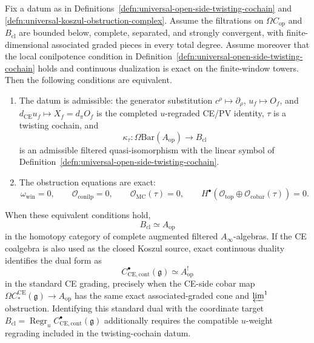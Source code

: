 \begin{thm}
\label{thm:universal-filtered-cobar-recognition}
  Fix a datum as in
  Definitions~\ref{defn:universal-open-side-twisting-cochain} and
  \ref{defn:universal-koszul-obstruction-complex}.  Assume the
  filtrations on \(\Omega C_{\mathrm{op}}\) and \(B_{\mathrm{cl}}\) are
  bounded below, complete, separated, and strongly convergent, with
  finite-dimensional associated graded pieces in every total degree.
  Assume moreover that the local conilpotence condition in
  Definition~\ref{defn:universal-open-side-twisting-cochain} holds and
  continuous dualization is exact on the finite-window towers.
  Then the following conditions are equivalent.
  \begin{enumerate}[label=(A\arabic*)]
    \item The datum is admissible: the generator substitution
      \(c^\rho\mapsto\partial_\rho\), \(u_f\mapsto O_f\), and
      \(d_{\mathrm{CE}}u_f\mapsto X_f=d_\pi O_f\) is the completed
      \(u\)-regraded CE/PV identity,
      \(\tau\) is a twisting cochain, and
      \[
        \kappa_\tau\colon
        \Omega\mathrm{Bar}(A_{\mathrm{op}})
        \longrightarrow B_{\mathrm{cl}}
      \]
      is an admissible filtered quasi-isomorphism with the linear symbol
      of Definition~\ref{defn:universal-open-side-twisting-cochain}.
    \item The obstruction equations are exact:
      \[
        \omega_{\mathrm{win}}=0,\qquad
        \mathcal O_{\mathrm{conilp}}=0,\qquad
        \mathcal O_{\mathrm{MC}}(\tau)=0,\qquad
        H^\bullet\!\left(
          \mathcal O_{\mathrm{top}}
          \oplus
          \mathcal O_{\mathrm{cobar}}(\tau)
        \right)=0 .
      \]
  \end{enumerate}
  When these equivalent conditions hold,
  \[
    B_{\mathrm{cl}}
      \simeq
    A_{\mathrm{op}}
  \]
  in the homotopy category of complete augmented filtered
  \(A_\infty\)-algebras.  If the CE coalgebra is also used as the closed
  Koszul source, exact continuous duality identifies the dual form as
  \[
    C^\bullet_{\mathrm{CE},\mathrm{cont}}(\mathfrak g)
      \simeq
    A_{\mathrm{op}}^!
  \]
  in the standard CE grading, precisely when the CE-side cobar map
  \(\Omega C_*^{\mathrm{CE}}(\mathfrak g)\to A_{\mathrm{op}}\) has the
  same exact associated-graded cone and \(\varprojlim^1\) obstruction.
  Identifying this standard dual with the coordinate target
  \(B_{\mathrm{cl}}=\operatorname{Regr}_u
  C^\bullet_{\mathrm{CE},\mathrm{cont}}(\mathfrak g)\) additionally
  requires the compatible \(u\)-weight regrading included in the
  twisting-cochain datum.
\end{thm}

